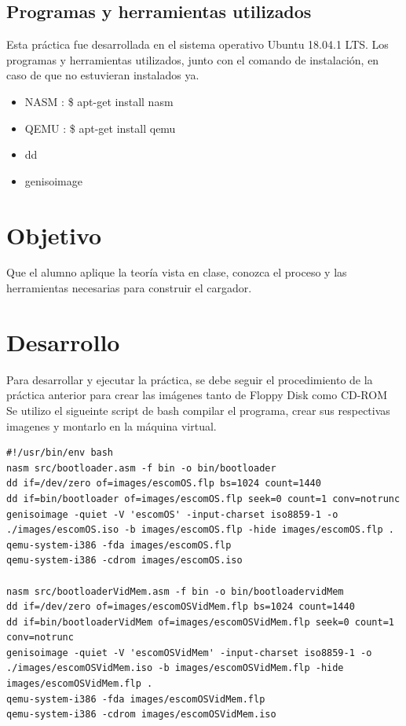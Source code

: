 \documentclass[12pt]{article}
\begin{document}
\subsection{Programas y herramientas utilizados}
Esta práctica fue desarrollada en el sistema operativo Ubuntu 18.04.1 LTS. Los programas y herramientas utilizados, junto con el comando de instalación, en caso de que no estuvieran instalados ya. 
\begin{itemize}
    \item NASM : \$ apt-get install nasm
    \item QEMU : \$ apt-get install qemu
    \item dd
    \item genisoimage
\end{itemize}
\section{Objetivo}
Que el alumno aplique la teoría vista en clase, conozca el proceso y las herramientas necesarias para construir el cargador.
\section{Desarrollo}
Para desarrollar y ejecutar la práctica, se debe seguir el procedimiento de la práctica anterior para crear las imágenes tanto de Floppy Disk como CD-ROM\\
Se utilizo el sigueinte script de bash compilar el programa, crear sus respectivas imagenes y montarlo en la máquina virtual.
\begin{verbatim}
#!/usr/bin/env bash
nasm src/bootloader.asm -f bin -o bin/bootloader
dd if=/dev/zero of=images/escomOS.flp bs=1024 count=1440
dd if=bin/bootloader of=images/escomOS.flp seek=0 count=1 conv=notrunc
genisoimage -quiet -V 'escomOS' -input-charset iso8859-1 -o ./images/escomOS.iso -b images/escomOS.flp -hide images/escomOS.flp .
qemu-system-i386 -fda images/escomOS.flp
qemu-system-i386 -cdrom images/escomOS.iso

nasm src/bootloaderVidMem.asm -f bin -o bin/bootloadervidMem
dd if=/dev/zero of=images/escomOSVidMem.flp bs=1024 count=1440
dd if=bin/bootloaderVidMem of=images/escomOSVidMem.flp seek=0 count=1 conv=notrunc
genisoimage -quiet -V 'escomOSVidMem' -input-charset iso8859-1 -o ./images/escomOSVidMem.iso -b images/escomOSVidMem.flp -hide images/escomOSVidMem.flp .
qemu-system-i386 -fda images/escomOSVidMem.flp
qemu-system-i386 -cdrom images/escomOSVidMem.iso
\end{verbatim}
\end{document}
